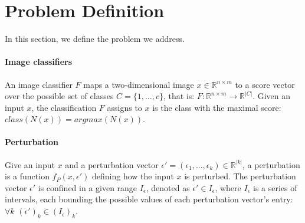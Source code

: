 
\section{Problem Definition}
In this section, we define the problem we address.

\paragraph{Image classifiers}
An image classifier $F$ maps a two-dimensional image $x\in \mathbb{R}^{n \times m}$ to a score vector over the possible set of classes $C=\{1,\ldots,c\}$, that is:
$F: \mathbb{R}^{n \times m} \rightarrow {\mathbb{R}}^{|C|}$.
Given an input $x$, the classification $F$ assigns to $x$ is the class with the maximal score: $class(N(x))=argmax(N(x))$.

\paragraph{Perturbation}
Give an input $x$ and a perturbation vector $\epsilon'=(\epsilon_1,...,\epsilon_k)\in{\mathbb{R}}^{|k|}$, a perturbation is a function $f_P(x,\epsilon')$ defining how the input $x$ is perturbed. The perturbation vector $\epsilon'$ is confined in a given range $I_\epsilon$, denoted as $\epsilon'\in I_\epsilon$, where $I_\epsilon$ is a series of intervals, each bounding the possible values of each perturbation vector's entry: $\forall{k}$ $(\epsilon')_k\in (I_\epsilon)_k$.

